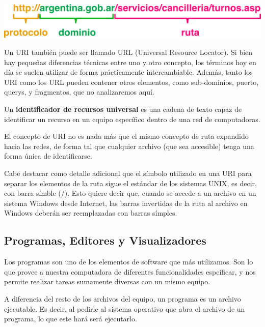 \vspace{0.5cm}
\centerline{\includegraphics[]{capitulos/informatica/imagenes/uris.png}}

Un URI también puede ser llamado URL (Universal Resource Locator). Si bien hay
pequeñas diferencias técnicas entre uno y otro concepto, los términos hoy en día
se suelen utilizar de forma prácticamente intercambiable. Además, tanto los URI
como los URL pueden contener otros elementos, como sub-dominios, puerto, querys,
y fragmentos, que no analizaremos aquí.

\begin{definition}
    Un \textbf{identificador de recursos universal} es una cadena de texto
    capaz de identificar un recurso en un equipo específico dentro de una
    red de computadoras.
\end{definition}

El concepto de URI no es nada más que el mismo concepto de ruta expandido hacia
las redes, de forma tal que cualquier archivo (que sea accesible) tenga una forma
única de identificarse.

Cabe destacar como detalle adicional que el símbolo utilizado en una URI para
separar los elementos de la ruta sigue el estándar de los sistemas UNIX, es decir,
con barra símble (/). Esto quiere decir que, cuando se accede a un archivo en un
sistema Windows desde Internet, las barras invertidas de la ruta al archivo en
Windows deberán ser reemplazadas con barras símples.

\subsection{Programas, Editores y Visualizadores}

Los programas son uno de los elementos de software que más utilizamos. Son lo que
provee a nuestra computadora de diferentes funcionalidades espcíficar, y nos
permite realizar tareas sumamente diversas con un mismo equipo.

A diferencia del resto de los archivos del equipo, un programa es un
archivo ejecutable. Es decir, al pedirle al sistema operativo que abra el
archivo de un programa, lo que este hará será ejecutarlo.

